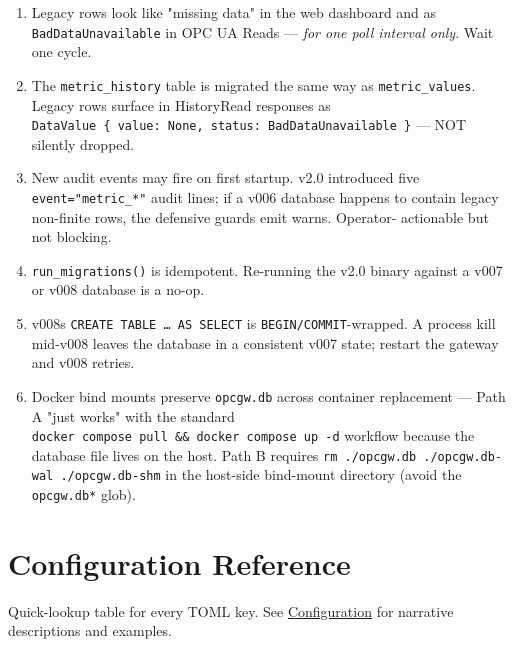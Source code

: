 \begin{enumerate}
\def\labelenumi{\arabic{enumi}.}
\item
  Legacy rows look like "missing data" in the web dashboard and as \texttt{BadDataUnavailable} in OPC UA Reads --- \emph{for one poll interval only}. Wait one cycle.
\item
  The \texttt{metric\_history} table is migrated the same way as \texttt{metric\_values}. Legacy rows surface in HistoryRead responses as \texttt{DataValue\ \{\ value:\ None,\ status:\ BadDataUnavailable\ \}} --- NOT silently dropped.
\item
  New audit events may fire on first startup. v2.0 introduced five \texttt{event="metric\_*"} audit lines; if a v006 database happens to contain legacy non-finite rows, the defensive guards emit warns. Operator- actionable but not blocking.
\item
  \texttt{run\_migrations()} is idempotent. Re-running the v2.0 binary against a v007 or v008 database is a no-op.
\item
  v008\textquotesingle s \texttt{CREATE\ TABLE\ …\ AS\ SELECT} is \texttt{BEGIN/COMMIT}-wrapped. A process kill mid-v008 leaves the database in a consistent v007 state; restart the gateway and v008 retries.
\item
  Docker bind mounts preserve \texttt{opcgw.db} across container replacement --- Path A "just works" with the standard \texttt{docker\ compose\ pull\ \&\&\ docker\ compose\ up\ -d} workflow because the database file lives on the host. Path B requires \texttt{rm\ ./opcgw.db\ ./opcgw.db-wal\ ./opcgw.db-shm} in the host-side bind-mount directory (avoid the \texttt{opcgw.db*} glob).
\end{enumerate}

\appendix

\chapter{Configuration Reference}\label{app-config-reference}

Quick-lookup table for every TOML key. See \hyperref[ch-configuration]{Configuration} for narrative descriptions and examples.

